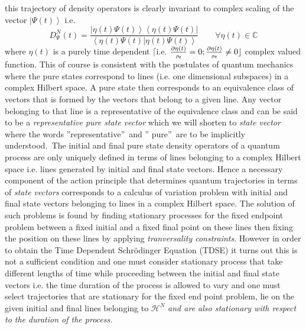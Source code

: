 \documentclass[aps,preprint]{revtex4}
\begin{document}
this trajectory of density operators is clearly invariant to complex scaling
of the vector $\left\vert \Psi\left( t\right) \right\rangle $ i.e. 
\begin{equation}
D_{\Psi}^{N}\left( t\right) =\frac{\left\vert \eta\left( t\right) \Psi\left(
t\right) \right\rangle \left\langle \eta\left( t\right) \Psi\left( t\right)
\right\vert }{\left\langle \eta\left( t\right) \Psi\left( t\right)
|\eta\left( t\right) \Psi\left( t\right) \right\rangle }\qquad\forall\eta%
\left( t\right) \in\mathbb{C}
\end{equation}
where $\eta\left( t\right) $ is a purely time dependent $\lceil$i.e. $\frac{%
\partial\eta\left( t\right) }{_{\partial\mathsf{z}}}=0;\frac {%
\partial\eta\left( t\right) }{_{\partial t}}\neq0\rfloor$ complex valued
function. This of course is consistent with the postulates of quantum
mechanics where the pure states correspond to lines (i.e. one dimensional
subspaces) in a complex Hilbert space. A pure state then corresponds to an
equivalence class of vectors that is formed by the vectors that belong to a
given line. Any vector belonging to that line is a representative of the
equivalence class and can be said to be a \emph{representative pure state
vector} which we will shorten to \emph{state vector }where the words
\textquotedblright representative\textquotedblright\ and \textquotedblright
pure\textquotedblright\ are to be implicitly understood.\emph{\ }The initial
and final pure state density operators of a quantum process are only
uniquely defined in terms of lines belonging to a complex Hilbert space i.e.
lines generated by initial and final state vectors. Hence a necessary
component of the action principle that determines quantum trajectories in
terms of \emph{state vectors} corresponds to a calculus of variation problem
with initial and final state vectors belonging to lines in a complex Hilbert
space. The solution of such problems is found by finding stationary
processes for the fixed endpoint problem between a fixed initial and a fixed
final point on these lines then fixing the position on these lines by
applying \emph{tranversality constraints}. However in order to obtain the
Time Dependent Schr\"{o}dinger Equation (TDSE) it turns out this is not a
sufficient condition and one must consider stationary process that take
different lengths of time while proceeding between the initial and final
state vectors i.e. the time duration of the process is allowed to vary and
one must select trajectories that are stationary for the fixed end point
problem, lie on the given initial and final lines belonging to $\mathcal{H}%
^{N}$ \emph{and are also stationary with respect to the duration of the
process.}
\end{document}
